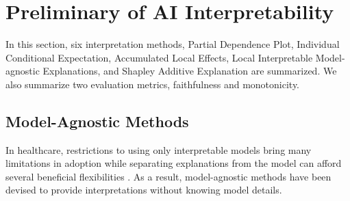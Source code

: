 


\section{Preliminary of AI Interpretability}

In this section, six interpretation methods, Partial Dependence Plot, Individual Conditional Expectation, Accumulated Local Effects, Local Interpretable Model-agnostic Explanations, and Shapley Additive Explanation are summarized. We also summarize two evaluation metrics, faithfulness and monotonicity.

\subsection{Model-Agnostic Methods}

In healthcare, restrictions to using only interpretable models bring many limitations in adoption while separating explanations from the model can afford several beneficial flexibilities \citep{ribeiro2016modelagnostic}. As a result, model-agnostic methods have been devised to provide interpretations without knowing model details.



